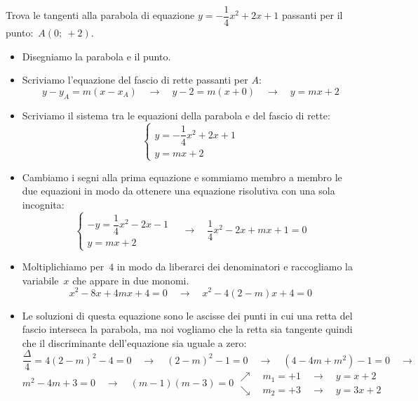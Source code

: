 \begin{esempio}
 Trova le tangenti alla parabola di equazione \(y=-\dfrac{1}{4}x^2+2x +1\) 
 passanti per il punto:~\(A(0;~+2)\).
 
 \begin{itemize}
  \item Disegniamo la parabola e il punto.
  \item Scriviamo l'equazione del fascio di rette passanti per \(A\):
\[y-y_A = m(x-x_A) \quad \rightarrow \quad 
y-2 = m\left(x+0\right)
\quad \rightarrow \quad y=mx+2\]
  \item Scriviamo il sistema tra le equazioni della parabola e del fascio di 
   rette:
\[\left\{\begin{array}{l}
  y=-\dfrac{1}{4}x^2+2x +1\\
  y=mx+2
\end{array}\right. \]
  \item Cambiamo i segni alla prima equazione e sommiamo membro a membro le
   due equazioni in modo da ottenere una equazione risolutiva con una sola 
   incognita:
\[\left\{\begin{array}{l}
  -y=\dfrac{1}{4}x^2-2x-1\\
  y=mx+2
\end{array}\right. \quad \rightarrow \quad 
\dfrac{1}{4}x^2-2x+mx+1=0\]
  \item Moltiplichiamo per~\(4\) in modo da liberarci dei denominatori e 
   raccogliamo la variabile~\(x\) che appare in due monomi.
\[x^2-8x+4mx+4=0 \quad \rightarrow \quad x^2-4(2-m)x+4=0\]
  \item Le soluzioni di questa equazione sono le ascisse dei punti in cui una 
   retta del fascio interseca la parabola, ma noi vogliamo che la retta sia
   tangente quindi che il discriminante dell'equazione sia uguale a zero:
\[\dfrac{\Delta}{4}=4(2-m)^2-4=0 \quad \rightarrow \quad 
(2-m)^2-1=0 \quad \rightarrow \quad
(4-4m+m^2)-1=0 \quad \rightarrow \quad\]
\[m^2-4m+3=0 \quad \rightarrow \quad
(m-1)(m-3)=0 
 \begin{array}{l}
  \nearrow \quad m_1=+1 \quad \rightarrow \quad y=x+2\\
  \searrow \quad m_2=+3 \quad \rightarrow \quad y=3x+2
 \end{array}\]
 \end{itemize}
\end{esempio}

